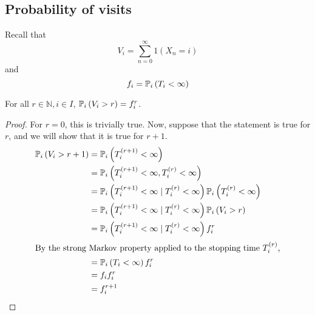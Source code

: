 \subsection{Probability of visits}
Recall that
\[
	V_i = \sum_{n=0}^\infty 1(X_n = i)
\]
and
\[
	f_i = \mathbb{P}_{i}\left({T_i < \infty}\right)
\]
\begin{lemma}
	For all \( r \in \mathbb N, i \in I \), \( \mathbb{P}_{i}\left({V_i > r}\right) = f_i^r \).
\end{lemma}
\begin{proof}
	For \( r = 0 \), this is trivially true.
	Now, suppose that the statement is true for \( r \), and we will show that it is true for \( r + 1 \).
	\begin{align*}
		\mathbb{P}_{i}\left({V_i > r+1}\right) & = \mathbb{P}_{i}\left({T_i^{(r+1)} < \infty}\right)                                                      \\
		                    & = \mathbb{P}_{i}\left({T_i^{(r+1)} < \infty, T_i^{(r)} < \infty}\right)                                  \\
		                    & = \mathbb{P}_{i}\left({T_i^{(r+1)} < \infty \mid T_i^{(r)} < \infty}\right) \mathbb{P}_{i}\left({T_i^{(r)} < \infty}\right) \\
		                    & = \mathbb{P}_{i}\left({T_i^{(r+1)} < \infty \mid T_i^{(r)} < \infty}\right) \mathbb{P}_{i}\left({V_i > r}\right)            \\
		                    & = \mathbb{P}_{i}\left({T_i^{(r+1)} < \infty \mid T_i^{(r)} < \infty}\right) f_i^r                        \\
		\intertext{By the strong Markov property applied to the stopping time \( T_i^{(r)} \),}
		                    & = \mathbb{P}_{i}\left({T_i < \infty}\right) f_i^r                                                        \\
		                    & = f_i f_i^r                                                                           \\
		                    & = f_i^{r+1}
	\end{align*}
\end{proof}

